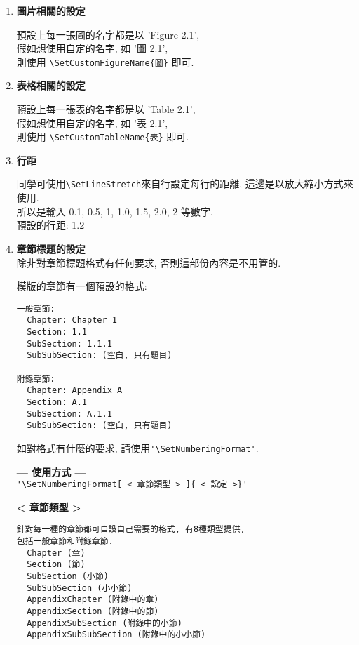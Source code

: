 \begin{enumerate}
  \item
  {
    \textbf{圖片相關的設定}

    預設上每一張圖的名字都是以 'Figure 2.1',\\
    假如想使用自定的名字, 如 '圖 2.1',\\
    則使用 \verb|\SetCustomFigureName{圖}| 即可.
  } %

  \item
  {
    \textbf{表格相關的設定}

    預設上每一張表的名字都是以 'Table 2.1',\\
    假如想使用自定的名字, 如 '表 2.1',\\
    則使用 \verb|\SetCustomTableName{表}| 即可.
  } %

  \item
  {
    \textbf{行距}

    同學可使用\verb|\SetLineStretch|來自行設定每行的距離, 這邊是以放大縮小方式來使用.\\
    所以是輸入 0.1, 0.5, 1, 1.0, 1.5, 2.0, 2 等數字.\\
    預設的行距: 1.2
  } %

  \newpage
  \item
  {
    \textbf{章節標題的設定}\\
    除非對章節標題格式有任何要求, 否則這部份內容是不用管的.

    模版的章節有一個預設的格式:
    \begin{DescriptionFrame}
    \begin{verbatim}
一般章節:
  Chapter: Chapter 1
  Section: 1.1
  SubSection: 1.1.1
  SubSubSection: (空白, 只有題目)

附錄章節:
  Chapter: Appendix A
  Section: A.1
  SubSection: A.1.1
  SubSubSection: (空白, 只有題目)
    \end{verbatim}
    \end{DescriptionFrame}

    如對格式有什麼的要求, 請使用\verb|'\SetNumberingFormat'|.

    \textbf{--- 使用方式 ---}\\
    \verb|'\SetNumberingFormat[ < 章節類型 > ]{ < 設定 >}'|

    \textbf{< 章節類型 >}
    \begin{DescriptionFrame}
    \begin{verbatim}
針對每一種的章節都可自設自己需要的格式, 有8種類型提供,
包括一般章節和附錄章節.
  Chapter (章)
  Section (節)
  SubSection (小節)
  SubSubSection (小小節)
  AppendixChapter (附錄中的章)
  AppendixSection (附錄中的節)
  AppendixSubSection (附錄中的小節)
  AppendixSubSubSection (附錄中的小小節)
    \end{verbatim}
    \end{DescriptionFrame}

}
\end{enumerate}
